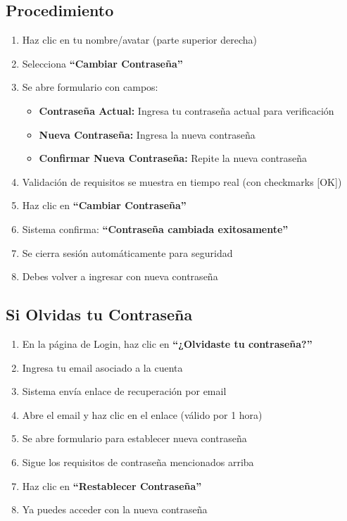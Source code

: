 \documentclass[12pt,a4paper,spanish,oneside]{report}
\begin{document}
\subsection{Procedimiento}

\begin{enumerate}
\item Haz clic en tu nombre/avatar (parte superior derecha)
\item Selecciona \textbf{``Cambiar Contraseña''}
\item Se abre formulario con campos:
\begin{itemize}
\item \textbf{Contraseña Actual:} Ingresa tu contraseña actual para verificación
\item \textbf{Nueva Contraseña:} Ingresa la nueva contraseña
\item \textbf{Confirmar Nueva Contraseña:} Repite la nueva contraseña
\end{itemize}
\item Validación de requisitos se muestra en tiempo real (con checkmarks [OK])
\item Haz clic en \textbf{``Cambiar Contraseña''}
\item Sistema confirma: \textbf{``Contraseña cambiada exitosamente''}
\item Se cierra sesión automáticamente para seguridad
\item Debes volver a ingresar con nueva contraseña
\end{enumerate}

\subsection{Si Olvidas tu Contraseña}

\begin{enumerate}
\item En la página de Login, haz clic en \textbf{``¿Olvidaste tu contraseña?''}
\item Ingresa tu email asociado a la cuenta
\item Sistema envía enlace de recuperación por email
\item Abre el email y haz clic en el enlace (válido por 1 hora)
\item Se abre formulario para establecer nueva contraseña
\item Sigue los requisitos de contraseña mencionados arriba
\item Haz clic en \textbf{``Restablecer Contraseña''}
\item Ya puedes acceder con la nueva contraseña
\end{enumerate}
\end{document}
